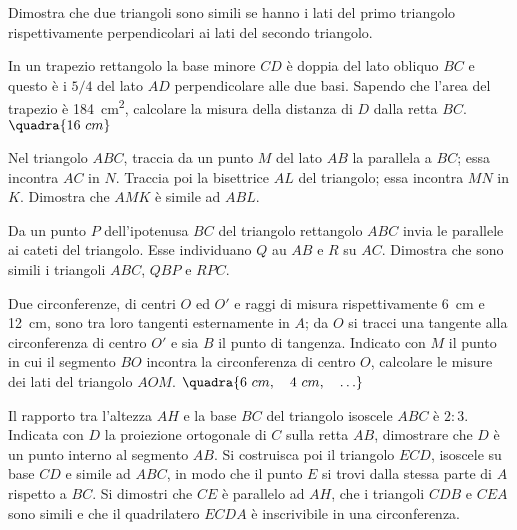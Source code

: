 \begin{multicols}{2}
\begin{esercizio}
\label{ese:6.68}
Dimostra che due triangoli sono simili se hanno i lati del primo 
triangolo rispettivamente perpendicolari ai lati del secondo 
triangolo. 
\end{esercizio}

\begin{esercizio}
\label{ese:6.69}
In un trapezio rettangolo la base minore $CD$ è doppia del lato 
obliquo $BC$ e questo è i $5/4$ del lato $AD$ perpendicolare alle due 
basi. Sapendo che l'area del trapezio è 184~cm\textsuperscript{2}, 
calcolare la misura della distanza di $D$ dalla retta $BC$.  
\hfill$\quadra{16~cm}$
\end{esercizio}

\begin{esercizio}
\label{ese:6.70}
Nel triangolo $ABC$, traccia da un punto $M$ del lato $AB$ la 
parallela a $BC$; essa incontra $AC$ in $N$. Traccia poi la 
bisettrice $AL$ del triangolo; essa incontra $MN$ in $K$. Dimostra che 
$AMK$ è simile ad $ABL$.
\end{esercizio}

\begin{esercizio}
\label{ese:6.71}
Da un punto $P$ dell'ipotenusa $BC$ del triangolo rettangolo $ABC$ 
invia le parallele ai cateti del triangolo. Esse individuano $Q$ au 
$AB$ e $R$ su $AC$. Dimostra che sono simili i triangoli $ABC$, $QBP$ 
e $RPC$.
\end{esercizio}

\begin{esercizio}
\label{ese:6.72}
Due circonferenze, di centri $O$ ed $O'$ e raggi di misura 
rispettivamente 6~cm e 12~cm, sono tra loro tangenti esternamente in 
$A$; da $O$ si tracci una tangente alla circonferenza di centro $O'$ 
e sia $B$ il punto di tangenza. Indicato con $M$ il punto in cui il 
segmento $BO$ incontra la circonferenza di centro $O$, calcolare le 
misure dei lati del triangolo $AOM$.
\hfill$\quadra{6~cm,\quad 4~cm,\quad \ldots}$
\end{esercizio}

\begin{esercizio}
\label{ese:6.73}
Il rapporto tra l'altezza $AH$ e la base $BC$ del triangolo isoscele 
$ABC$ è $2:3$. Indicata con $D$ la proiezione ortogonale di $C$ sulla 
retta $AB$, dimostrare che $D$ è un punto interno al segmento $AB$. 
Si costruisca poi il triangolo $ECD$, isoscele su base $CD$ e simile 
ad $ABC$, in modo che il punto $E$ si trovi dalla stessa parte di $A$ 
rispetto a $BC$. Si dimostri che $CE$ è parallelo ad $AH$, che i 
triangoli $CDB$ e $CEA$ sono simili e che il quadrilatero $ECDA$ è 
inscrivibile in una circonferenza.
\end{esercizio}


\end{multicols}
